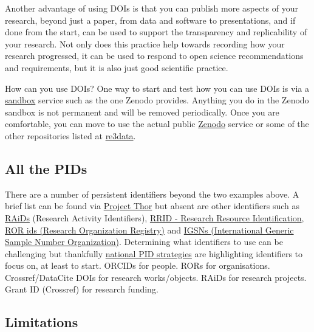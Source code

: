 \documentclass[
  letterpaper,
  DIV=11,
  numbers=noendperiod]{scrreport}
\begin{document}
Another advantage of using DOIs is that you can publish more aspects of
your research, beyond just a paper, from data and software to
presentations, and if done from the start, can be used to support the
transparency and replicability of your research. Not only does this
practice help towards recording how your research progressed, it can be
used to respond to open science recommendations and requirements, but it
is also just good scientific practice.

How can you use DOIs? One way to start and test how you can use DOIs is
via a \href{https://sandbox.zenodo.org/}{sandbox} service such as the
one Zenodo provides. Anything you do in the Zenodo sandbox is not
permanent and will be removed periodically. Once you are comfortable,
you can move to use the actual public \href{https://zenodo.org/}{Zenodo}
service or some of the other repositories listed at
\href{https://www.re3data.org/}{re3data}.

\hypertarget{all-the-pids}{%
\subsection{All the PIDs}\label{all-the-pids}}

There are a number of persistent identifiers beyond the two examples
above. A brief list can be found via
\href{https://project-thor.readme.io/docs/project-glossary}{Project
Thor} but absent are other identifiers such as
\href{https://ardc.edu.au/services/ardc-identifier-services/raid-research-activity-identifier-service/}{RAiDs}
(Research Activity Identifiers),
\href{https://scicrunch.org/resources}{RRID - Research Resource
Identification}, \href{https://ror.org/}{ROR ids (Research Organization
Registry)} and \href{https://www.igsn.org/}{IGSNs (International Generic
Sample Number Organization)}. Determining what identifiers to use can be
challenging but thankfully
\href{https://www.rd-alliance.org/national-pid-strategies-opportunities-collaboration-and-alignment}{national
PID strategies} are highlighting identifiers to focus on, at least to
start. ORCIDs for people. RORs for organisations. Crossref/DataCite DOIs
for research works/objects. RAiDs for research projects. Grant ID
(Crossref) for research funding.

\hypertarget{limitations}{%
\subsection{Limitations}\label{limitations}}
\end{document}

